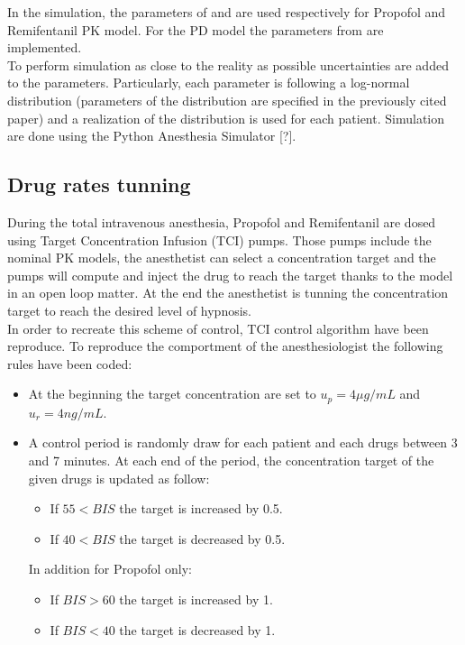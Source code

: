 In the simulation, the parameters of \cite{eleveldPharmacokineticPharmacodynamicModel2018} and \cite{eleveldAllometricModelRemifentanil2017} are used respectively for Propofol and Remifentanil PK model. For the PD model the parameters from \cite{bouillonPharmacodynamicInteractionPropofol2004} are implemented. \\
To perform simulation as close to the reality as possible uncertainties are added to the parameters. Particularly, each parameter is following a log-normal distribution (parameters of the distribution are specified in the previously cited paper) and a realization of the distribution is used for each patient. Simulation are done using the Python Anesthesia Simulator [?].

\subsection{Drug rates tunning}

During the total intravenous anesthesia, Propofol and Remifentanil are dosed using Target Concentration Infusion (TCI) pumps. Those pumps include the nominal PK models, the anesthetist can select a concentration target and the pumps will compute and inject the drug to reach the target thanks to the model in an open loop matter. At the end the anesthetist is tunning the concentration target to reach the desired level of hypnosis.\\


In order to recreate this scheme of control, TCI control algorithm \cite{shaferAlgorithmsRapidlyAchieve1992} have been reproduce. To reproduce the comportment of the anesthesiologist the following rules have been coded:
\begin{itemize}
\item At the beginning the target concentration are set to $u_p = 4 \mu g/mL$ and $u_r = 4 ng/mL$.
\item A control period is randomly draw for each patient and each drugs between 3 and 7 minutes. At each end of the period, the concentration target of the given drugs is updated as follow:
\begin{itemize}
	\item If $55<BIS$ the target is increased by 0.5.
	\item If $40<BIS$ the target is decreased by 0.5.
\end{itemize}
In addition for Propofol only:
\begin{itemize}
	\item If $BIS>60$ the target is increased by 1.
	\item If $BIS<40$ the target is decreased by 1.
\end{itemize}
\end{itemize}

